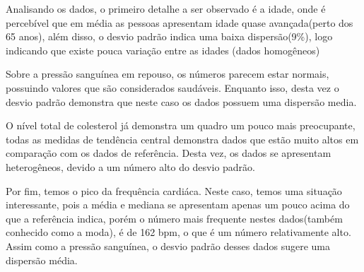     Analisando os dados, o primeiro detalhe a ser observado é a idade, onde é percebível que em média
    as pessoas apresentam idade quase avançada(perto dos 65 anos), além disso, o desvio padrão indica 
    uma baixa dispersão(9\%), logo indicando que existe pouca variação entre as idades 
    (dados homogêneos)

    Sobre a pressão sanguínea em repouso, os números parecem estar normais, possuindo valores 
    que são considerados saudáveis. Enquanto isso, desta vez o desvio padrão demonstra que neste caso 
    os dados possuem uma dispersão media.

    O nível total de colesterol já demonstra um quadro um pouco mais preocupante, todas as medidas 
    de tendência central demonstra dados que estão muito altos em comparação com os dados de referência.
    Desta vez, os dados se apresentam heterogêneos, devido a um número alto do desvio padrão.

    Por fim, temos o pico da frequência cardiáca. Neste caso, temos uma situação interessante, pois 
    a média e mediana se apresentam apenas um pouco acima do que a referência indica, porém o número 
    mais frequente nestes dados(também conhecido como a moda), é de 162 bpm, o que é um número relativamente 
    alto. Assim como a pressão sanguínea, o desvio padrão desses dados sugere uma dispersão média.

    \nocite{sobremedidascentrais}
    \nocite{colesterol}
    \nocite{frequenciacardiaca}
